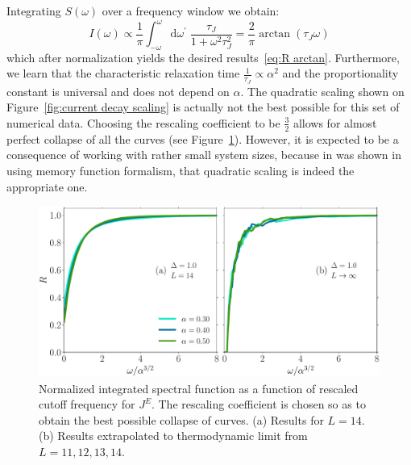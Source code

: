 Integrating \(S(\omega)\) over a frequency window we obtain:
\begin{equation*}
  I(\omega) \propto \frac{1}{\pi}\int_{-\omega}^{\omega}\mathrm{d}\omega^{\prime}\; 
  \frac{\tau_{J}}{1+\omega^2\tau_{J}^2} = \frac{2}{\pi} \arctan(\tau_{J} \omega)
\end{equation*}
which after normalization yields the desired results~\eqref{eq:R arctan}. Furthermore, we learn that the 
characteristic relaxation time \(\frac{1}{\tau_{J}} \propto \alpha^2\) and the proportionality
constant is universal and does not depend on \(\alpha\).
The quadratic scaling shown on Figure~\ref{fig:current decay scaling} is actually not the
best possible for this set of numerical data. Choosing the rescaling coefficient to be
\(\frac{3}{2}\) allows for almost perfect collapse of all the curves 
(see Figure~\ref{fig:current decay perfect scaling}). However, it is expected to be a consequence
of working with rather small system sizes, because in was shown 
in~\textcite{Mierzejewski2015Approx} using memory function formalism, that quadratic scaling
is indeed the appropriate one.
\begin{figure}[htbp]
  \centering
  \includegraphics[width=1.0\textwidth]{Figures/current_perfect_scaling.pdf}
  \caption{Normalized integrated spectral function as a function of 
  rescaled cutoff frequency for \(J^E\). The rescaling coefficient is chosen so as to obtain the 
  best possible collapse of curves. (a) Results for \(L=14\). (b) Results extrapolated
   to thermodynamic limit from \(L=11,12,13,14\).}\label{fig:current decay perfect scaling}
\end{figure}


